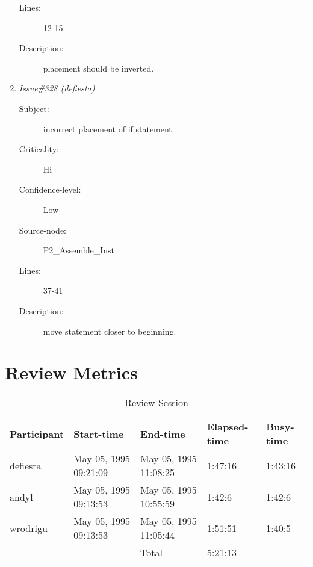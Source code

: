 \begin{enumerate}
\begin{description}
\item [Lines:] 12-15

\item [Description:] placement should be inverted.
\end{description}
\item {\it Issue\#328 (defiesta)}
\begin{description}
\item [Subject:] incorrect placement of if statement
\item [Criticality:] Hi
\item [Confidence-level:] Low
\item [Source-node:] P2\_Assemble\_Inst

\item [Lines:] 37-41

\item [Description:] move statement closer to beginning.
\end{description}
\end{enumerate}
\section{Review Metrics}
\begin{table}[hb]
\begin{center}
\begin{tabular}{|l|l|l|l|l|}
\hline
Participant & Start-time & End-time & Elapsed-time & Busy-time \\
\hline
defiesta & May 05, 1995 09:21:09 & May 05, 1995 11:08:25 & 1:47:16 & 1:43:16 \\
andyl & May 05, 1995 09:13:53 & May 05, 1995 10:55:59 & 1:42:6 & 1:42:6 \\
wrodrigu & May 05, 1995 09:13:53 & May 05, 1995 11:05:44 & 1:51:51 & 1:40:5 \\
\hline
 & & Total & 5:21:13 & \\
\hline
\end{tabular}
\end{center}
\caption{Review Session}
\end{table}


